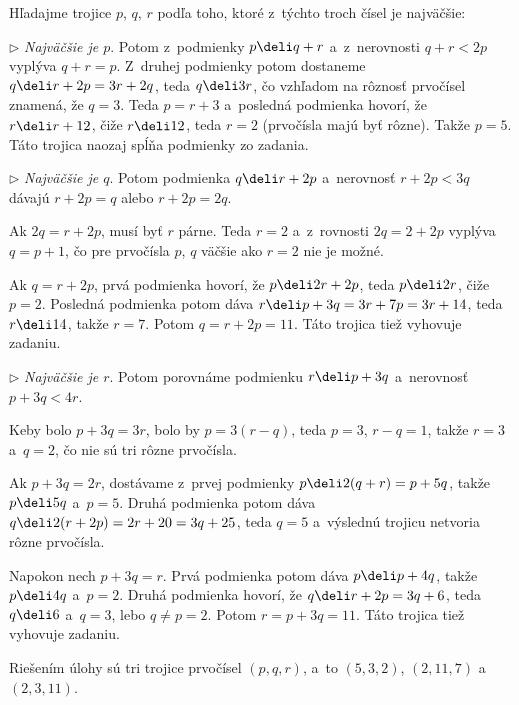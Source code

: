 {%
Hľadajme trojice $p$, $q$, $r$ podľa toho, ktoré z~týchto troch
čísel je najväčšie:

\item{$\triangleright$}
{\it Najväčšie je $p$}. Potom z~podmienky $p\deli q+r$ a~z~nerovnosti
$q+r<2p$ vyplýva $q+r=p$. Z~druhej podmienky potom dostaneme $q\deli
r+2p=3r+2q$, teda $q\deli 3r$, čo vzhľadom na rôznosť prvočísel
znamená, že $q=3$. Teda $p=r+3$ a~posledná podmienka hovorí, že
$r\deli r+12$, čiže $r\deli 12$, teda $r=2$ (prvočísla majú byť
rôzne). Takže $p=5$. Táto trojica naozaj spĺňa podmienky zo
zadania.

\item{$\triangleright$}
{\it Najväčšie je $q$}. Potom podmienka $q\deli r+2p$ a~nerovnosť
$r+2p<3q$ dávajú $r+2p=q$ alebo $r+2p=2q$.
{\par}
Ak $2q=r+2p$, musí byť $r$ párne. Teda $r=2$ a~z~rovnosti
$2q=2+2p$ vyplýva $q=p+1$, čo pre prvočísla $p$, $q$ väčšie ako $r=2$
nie je možné.
{\par}
Ak $q=r+2p$, prvá podmienka hovorí, že $p\deli 2r+2p$, teda
$p\deli 2r$, čiže $p=2$. Posledná podmienka potom dáva $r\deli
p+3q=3r+7p=3r+14$, teda $r\deli 14$, takže $r=7$. Potom
$q=r+2p=11$. Táto trojica tiež vyhovuje zadaniu.

\item{$\triangleright$}
{\it Najväčšie je $r$}. Potom porovnáme podmienku $r\deli p+3q$ a~nerovnosť
$p+3q<4r$. 
{\par}
Keby bolo $p+3q=3r$, bolo by $p=3(r-q)$, teda $p=3$, $r-q=1$,
takže $r=3$ a~$q=2$, čo nie sú tri rôzne prvočísla.
{\par}
Ak $p+3q=2r$, dostávame z~prvej podmienky $p\deli 2(q+r)=p+5q$,
takže $p\deli 5q$ a~$p=5$. Druhá podmienka potom dáva $q\deli
2(r+2p)=2r+20=3q+25$, teda $q=5$ a~výslednú trojicu netvoria
rôzne prvočísla.
{\par}
Napokon nech $p+3q=r$. Prvá podmienka potom dáva $p\deli p+4q$,
takže $p\deli 4q$ a~$p=2$. Druhá podmienka hovorí, že $q\deli
r+2p=3q+6$, teda $q\deli 6$ a~$q=3$, lebo $q\ne p=2$. Potom
$r=p+3q=11$. Táto trojica tiež vyhovuje zadaniu.

\smallskip Riešením úlohy sú tri trojice prvočísel $(p,q,r)$, a~to
$(5,3,2)$, $(2,11,7)$ a $(2,3,11)$.}

